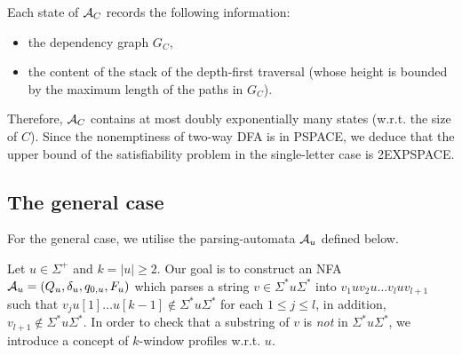 \documentclass{llncs}
\begin{document}
Each state of $\mathcal{A}_C$ records the following information: 
\begin{itemize}
\item the dependency graph $G_C$, 
\item the content of the stack of the depth-first traversal (whose height is bounded by the maximum length of the paths in $G_C$).
\end{itemize}
Therefore, $\mathcal{A}_C$ contains at most doubly exponentially many states (w.r.t. the size of $C$). Since the nonemptiness of two-way DFA is in PSPACE, we deduce that the upper bound of the satisfiability problem in the single-letter case is 2EXPSPACE.
 
\subsection{The general case}

For the general case, we utilise the parsing-automata $\mathcal{A}_u$ defined below.

Let $u \in \Sigma^+$ and $k=|u| \ge 2$.
Our goal is to construct an NFA $\mathcal{A}_u=(Q_u, \delta_u, q_{0,u}, F_u)$ which parses a string $v \in \Sigma^\ast u \Sigma^\ast$ into $v_1 u v_2 u \dots v_l u v_{l+1}$ such that $v_j u[1] \dots u[k-1] \not \in \Sigma^\ast u \Sigma^\ast$ for each $1 \le j \le l$, in addition, $v_{l+1} \not \in \Sigma^\ast u \Sigma^\ast$. 
In order to check that a substring of $v$ is \emph{not} in $\Sigma^\ast u \Sigma^\ast$, we introduce a concept of $k$-window profiles w.r.t. $u$.




\end{document}
